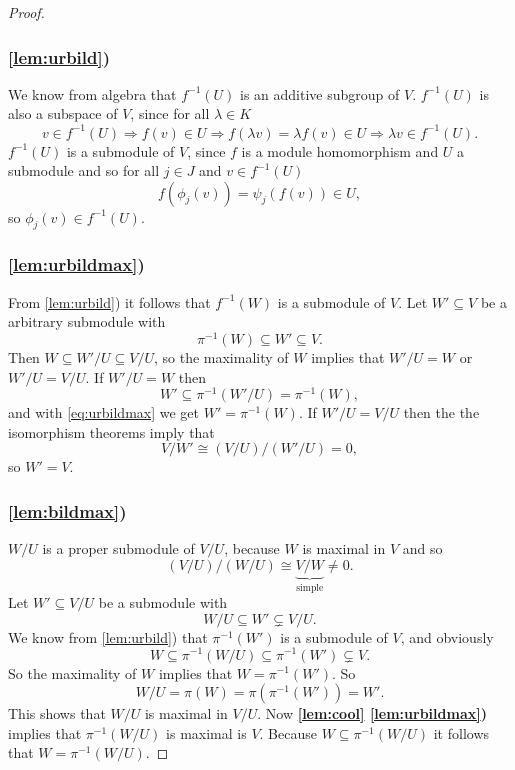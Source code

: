 \documentclass[a4paper,10pt]{article}
\theoremstyle{definition}
\begin{document}
\begin{proof}
 \subsubsection*{\ref{lem:urbild})}
  We know from algebra that $f^{-1}(U)$ is an additive subgroup of $V$. $f^{-1}(U)$ is also a subspace of $V$, since for all $\lambda \in K$
  \[
   v \in f^{-1}(U)
   \Rightarrow f(v) \in U
   \Rightarrow f(\lambda v) = \lambda f(v) \in U
   \Rightarrow \lambda v \in f^{-1}(U).
  \]
  $f^{-1}(U)$ is a submodule of $V$, since $f$ is a module homomorphism and $U$ a submodule and so for all $j \in J$ and $v \in f^{-1}(U)$
  \[
   f( \phi_j(v)) = \psi_j( f(v) ) \in U,
  \]
  so $\phi_j(v) \in f^{-1}(U)$.
 \subsubsection*{\ref{lem:urbildmax})}
  From \ref{lem:urbild}) it follows that $f^{-1}(W)$ is a submodule of $V$. Let $W' \subseteq V$ be a arbitrary submodule with
  \begin{equation}\label{eq:urbildmax}
   \pi^{-1}(W) \subseteq W' \subseteq V.
  \end{equation}
  Then $W \subseteq W'\!/U \subseteq V\!/U$, so the maximality of $W$ implies that $W'\!/U = W$ or $W'\!/U = V\!/U$. If $W'\!/U = W$ then
  \[
   W' \subseteq \pi^{-1}(W'\!/U) = \pi^{-1}(W),
  \]
  and with \eqref{eq:urbildmax} we get $W' = \pi^{-1}(W)$. If $W'\!/U = V\!/U$ then the the isomorphism theorems imply that
  \[
   V\!/W' \cong (V\!/U)/(W'\!/U) = 0,
  \]
  so $W' = V$.
 \subsubsection*{\ref{lem:bildmax})}
  $W\!/U$ is a proper submodule of $V\!/U$, because $W$ is maximal in $V$ and so
  \[
   (V\!/U)/(W\!/U) \cong \underbrace{V\!/W}_{\text{simple}} \neq 0.
  \]
  Let $W' \subseteq V\!/U$ be a submodule with
  \[
   W\!/U \subseteq W' \subsetneq V\!/U.
  \]
  We know from \ref{lem:urbild}) that $\pi^{-1}(W')$ is a submodule of $V$, and obviously
  \[
    W \subseteq \pi^{-1}(W\!/U) \subseteq \pi^{-1}(W') \subsetneq V.
  \]
  So the maximality of $W$ implies that $W = \pi^{-1}(W')$. So
  \[
   W\!/U = \pi(W) = \pi(\pi^{-1}(W')) = W'.
  \]
  This shows that $W\!/U$ is maximal in $V\!/U$. Now \textbf{\ref{lem:cool} \ref{lem:urbildmax})} implies that $\pi^{-1}(W\!/U)$ is maximal is $V$. Because $W \subseteq \pi^{-1}(W\!/U)$ it follows that $W = \pi^{-1}(W\!/U)$.
\end{proof}
\end{document}
